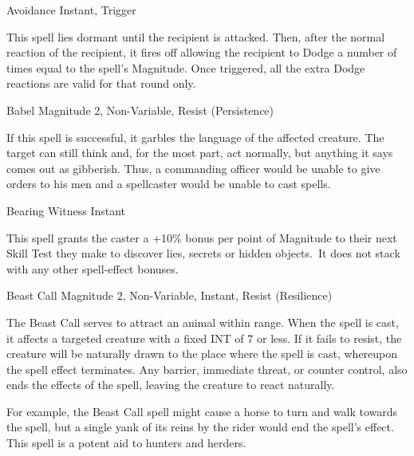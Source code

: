 \begin{rpg-spell}
{Avoidance}
{Instant, Trigger}

This spell lies dormant until the recipient is attacked. Then, after the normal reaction of the recipient, it fires off allowing the recipient to Dodge a number of times equal to the spell’s Magnitude. Once triggered, all the extra Dodge reactions are valid for that round only.
\end{rpg-spell}


\begin{rpg-spell}
{Babel}
{Magnitude 2, Non-Variable, Resist (Persistence)}

If this spell is successful, it garbles the language of the affected creature. The target can still think and, for the most part, act normally, but anything it says comes out as gibberish. Thus, a commanding officer would be unable to give orders to his men and a spellcaster would be unable to cast spells.
\end{rpg-spell}


\begin{rpg-spell}
{Bearing Witness}
{Instant}

This spell grants the caster a +10\% bonus per point of Magnitude to their next Skill Test they make to discover lies, secrets or hidden objects. It does not stack with any other spell-effect bonuses.
\end{rpg-spell}


\begin{rpg-spell}
{Beast Call}
{Magnitude 2, Non-Variable, Instant, Resist (Resilience)}

The Beast Call serves to attract an animal within range. When the spell is cast, it affects a targeted creature with a fixed INT of 7 or less. If it fails to resist, the creature will be naturally drawn to the place where the spell is cast, whereupon the spell effect terminates. Any barrier, immediate threat, or counter control, also ends the effects of the spell, leaving the creature to react naturally. 

For example, the Beast Call spell might cause a horse to turn and walk towards the spell, but a single yank of its reins by the rider would end the spell’s effect. This spell is a potent aid to hunters and herders.
\end{rpg-spell}


